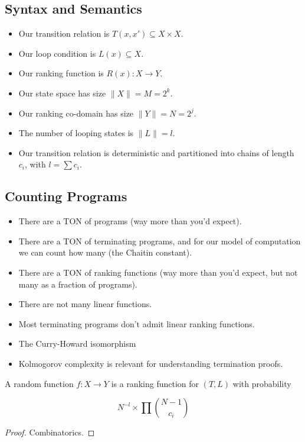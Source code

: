 \documentclass[a4paper]{llncs}
\begin{document}
\subsection{Syntax and Semantics}

\begin{itemize}
 \item Our transition relation is $T(x, x') \subseteq X \times X$.
 \item Our loop condition is $L(x) \subseteq X$.
 \item Our ranking function is $R(x) : X \to Y$.
 \item Our state space has size $\| X \| = M = 2^k$.
 \item Our ranking co-domain has size $\| Y \| = N = 2^j$.
 \item The number of looping states is $\| L \| = l$.
 \item Our transition relation is deterministic and partitioned into chains of length $c_i$, with $l = \sum c_i$.
\end{itemize}

\subsection{Counting Programs}
\begin{itemize}
 \item There are a TON of programs (way more than you'd expect).
 \item There are a TON of terminating programs, and for our model of computation we can count
  how many (the Chaitin constant).
 \item There are a TON of ranking functions (way more than you'd expect, but not many as a
  fraction of programs).
 \item There are not many linear functions.
 \item Most terminating programs don't admit linear ranking functions.
 \item The Curry-Howard isomorphism
 \item Kolmogorov complexity is relevant for understanding termination proofs.
\end{itemize}


\begin{theorem}
 A random function $f : X \to Y$ is a ranking function for $(T, L)$ with probability

 $$N^{-l} \times \prod {{N-1} \choose c_i}$$
\end{theorem}

\begin{proof}
 Combinatorics.
\end{proof}
\end{document}

